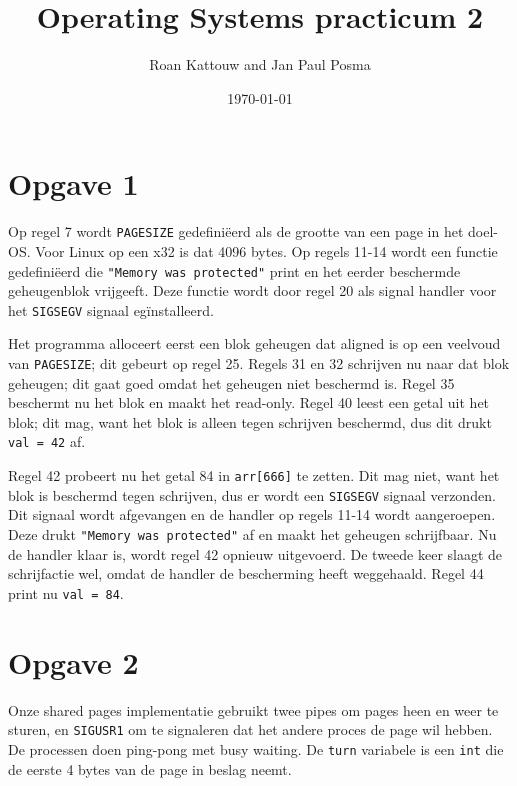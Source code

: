 \documentclass[11pt]{article}
\begin{document}
\author{Roan Kattouw and Jan Paul Posma}
\date{\today}
\title{Operating Systems practicum 2}

\maketitle

\section*{Opgave 1}
Op regel 7 wordt \verb+PAGESIZE+ gedefini\"eerd als de grootte van een page in het doel-OS.
Voor Linux op een x32 is dat 4096 bytes. Op regels 11-14 wordt een functie gedefini\"eerd die
\verb+"Memory was protected"+ print en het eerder beschermde geheugenblok vrijgeeft. Deze functie
wordt door regel 20 als signal handler voor het \verb+SIGSEGV+ signaal eg\"installeerd.

Het programma alloceert eerst een blok geheugen dat aligned is op een veelvoud van \verb+PAGESIZE+;
dit gebeurt op regel 25. Regels 31 en 32 schrijven nu naar dat blok geheugen; dit gaat goed
omdat het geheugen niet beschermd is. Regel 35 beschermt nu het blok en maakt het read-only.
Regel 40 leest een getal uit het blok; dit mag, want het blok is alleen tegen schrijven
beschermd, dus dit drukt \verb+val = 42+ af.

Regel 42 probeert nu het getal 84 in \verb+arr[666]+ te zetten. Dit mag niet, want het blok
is beschermd tegen schrijven, dus er wordt een \verb+SIGSEGV+ signaal verzonden. Dit signaal
wordt afgevangen en de handler op regels 11-14 wordt aangeroepen. Deze drukt \verb+"Memory was protected"+
af en maakt het geheugen schrijfbaar. Nu de handler klaar is, wordt regel 42 opnieuw uitgevoerd.
De tweede keer slaagt de schrijfactie wel, omdat de handler de bescherming heeft weggehaald.
Regel 44 print nu \verb+val = 84+.

\section*{Opgave 2}
Onze shared pages implementatie gebruikt twee pipes om pages heen en weer te sturen, en
\verb+SIGUSR1+ om te signaleren dat het andere proces de page wil hebben. De processen
doen ping-pong met busy waiting. De \verb+turn+ variabele is een \verb+int+ die de eerste
4 bytes van de page in beslag neemt.
\end{document}

